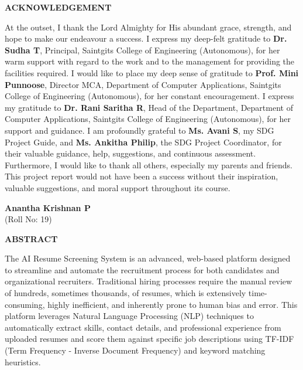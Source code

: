 \documentclass[12pt,a4paper]{report}
\begin{document}
\newpage
\thispagestyle{empty}
\begin{center}
\fontsize{16pt}{18pt}\selectfont
\textbf{ACKNOWLEDGEMENT}
\end{center}
\vspace{1cm}
\noindent At the outset, I thank the Lord Almighty for His abundant grace, strength, and hope to make our endeavour a success. I express my deep-felt gratitude to \textbf{Dr. Sudha T}, Principal, Saintgits College of Engineering (Autonomous), for her warm support with regard to the work and to the management for providing the facilities required.
\noindent I would like to place my deep sense of gratitude to \textbf{Prof. Mini Punnoose}, Director MCA, Department of Computer Applications, Saintgits College of Engineering (Autonomous), for her constant encouragement. I express my gratitude to \textbf{Dr. Rani Saritha R}, Head of the Department, Department of Computer Applications, Saintgits College of Engineering (Autonomous), for her support and guidance.
\noindent I am profoundly grateful to \textbf{Ms. Avani S}, my SDG Project Guide, and \textbf{Ms. Ankitha Philip}, the SDG Project Coordinator, for their valuable guidance, help, suggestions, and continuous assessment.
\noindent Furthermore, I would like to thank all others, especially my parents and friends. This project report would not have been a success without their inspiration, valuable suggestions, and moral support throughout its course.
\vspace{2cm}
\begin{flushright}
\textbf{Anantha Krishnan P}\\
(Roll No: 19)
\end{flushright}
\newpage
\thispagestyle{empty}
\begin{center}
\fontsize{16pt}{18pt}\selectfont
\textbf{ABSTRACT}
\end{center}
\vspace{1cm}
\noindent The AI Resume Screening System is an advanced, web-based platform designed to streamline and automate the recruitment process for both candidates and organizational recruiters. Traditional hiring processes require the manual review of hundreds, sometimes thousands, of resumes, which is extensively time-consuming, highly inefficient, and inherently prone to human bias and error. This platform leverages Natural Language Processing (NLP) techniques to automatically extract skills, contact details, and professional experience from uploaded resumes and score them against specific job descriptions using TF-IDF (Term Frequency - Inverse Document Frequency) and keyword matching heuristics.
\end{document}
